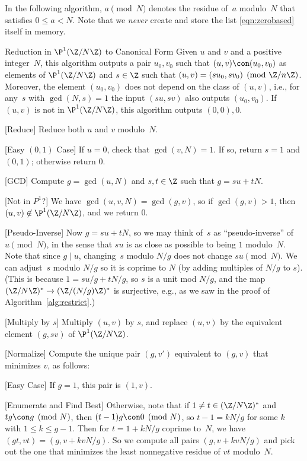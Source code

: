 In the following algorithm, $a \pmod{N}$ denotes the residue of~$a$
modulo~$N$ that satisfies $0 \leq a < N$.
Note that we {\em never} create and store the
list \eqref{eqn:zerobased} itself in memory.
\begin{algorithm}{Reduction in $\P^1(\Z/N\Z)$ 
to Canonical Form}\label{alg:p1rep}
Given $u$ and $v$ and a positive integer~$N$,
this algorithm outputs 
a pair $u_0, v_0$ such that $(u,v) \con (u_0,v_0)$ as
  elements of $\P^1(\Z/N\Z)$ and $s\in\Z$ such that $(u,v) = (su_0,
  sv_0) \pmod{\Z/n\Z}$.  
Moreover, the element $(u_0,v_0)$ does not
  depend on the class of $(u,v)$, i.e., for any~$s$ with $\gcd(N,s)=1$
  the input $(su,sv)$ also outputs $(u_0,v_0)$.  
  If $(u,v)$ is not in $\P^1(\Z/N\Z)$, this algorithm
  outputs $(0,0), 0$.
\begin{steps}
\item{}[Reduce] Reduce both $u$ and $v$ modulo~$N$.
\item{}[Easy $(0,1)$ Case] If $u=0$, check that $\gcd(v,N)=1$.
If so, return $s=1$ and $(0,1)$;  otherwise return $0$.
\item{}[GCD] Compute $g=\gcd(u,N)$ and $s,t\in\Z$ such that $g=su+tN$.
\item{}[Not in $P^1$?] We have $\gcd(u,v,N)=\gcd(g,v)$, so if 
$\gcd(g,v)>1$, then $(u,v)\not\in\P^1(\Z/N\Z)$,
and we return $0$.
\item{}[Pseudo-Inverse]
Now $g = su + tN$, so we may think of~$s$ as ``pseudo-inverse''
  of $u \pmod{N}$, in the sense that $su$ is as close as possible to
  being $1$ modulo~$N$. Note that since $g\mid u$, changing~$s$ modulo
  $N/g$ does not change $su\pmod{N}$.  We can adjust~$s$ modulo $N/g$
  so it is coprime to $N$ (by adding multiples of
$N/g$ to $s$).  (This is because $1 = s u/g + tN/g$, so
  $s$ is a unit mod $N/g$, and the map $(\Z/N\Z)^* \to (\Z/(N/g)\Z)^*$
 is surjective, e.g., as we saw in the proof of 
  Algorithm~\ref{alg:restrict}.)

\item{}[Multiply by $s$] Multiply $(u,v)$ by $s$, and replace  
$(u,v)$  by the
   equivalent element $(g,sv)$ of $\P^1(\Z/N\Z)$.

\item{}[Normalize] 
Compute the unique pair $(g,v')$ equivalent to $(g,v)$ that
minimizes $v$, as follows:
\begin{steps}
\item{}[Easy Case] If $g=1$, this pair is $(1,v)$.

\item{}[Enumerate and Find Best]
 Otherwise, note that if $1\neq t\in(\Z/N\Z)^*$ and
$tg \con g\pmod{N}$, then $(t-1)g \con 0\pmod{N}$, so $t-1 = kN/g$
for some $k$ with $1\leq k \leq g-1$.   Then for $t=1+kN/g$ coprime to~$N$, 
we have $(gt, vt) = (g, v+kvN/g)$.  So we compute
all pairs $(g, v+kvN/g)$ and pick out the one that minimizes the 
least nonnegative residue of $vt$ modulo~$N$.


\end{steps}
\end{steps}
\end{algorithm}
